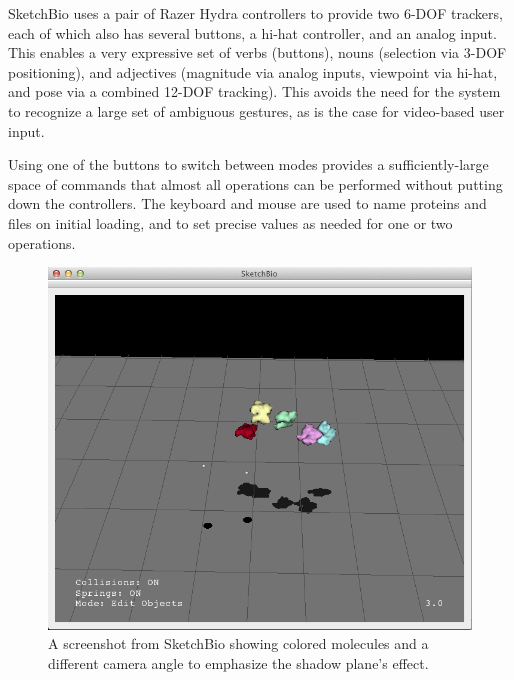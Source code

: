 \documentclass[twocolumn]{bmcart}%
\begin{document}
SketchBio uses a pair of Razer Hydra controllers to provide two 6-DOF trackers, each of which also has several buttons, a hi-hat controller, and an analog input.  This enables a very expressive set of verbs (buttons), nouns (selection via 3-DOF positioning), and adjectives (magnitude via analog inputs, viewpoint via hi-hat, and pose via a combined 12-DOF tracking).  This avoids the need for the system to recognize a large set of ambiguous gestures, as is the case for video-based user input.

Using one of the buttons to switch between modes provides a sufficiently-large space of commands that almost all operations can be performed without putting down the controllers.  The keyboard and mouse are used to name proteins and files on initial loading, and to set precise values as needed for one or two operations.

\begin{figure}[h]
\centering
\includegraphics[width=0.9\columnwidth]{shadow_plane.png}
\caption{A screenshot from SketchBio showing colored molecules and a different camera angle to emphasize the shadow plane's effect.}
\label{fig:shadow_plane}
\end{figure}
\end{document}
